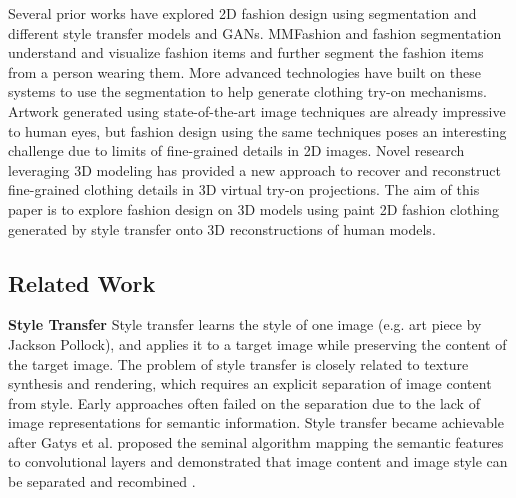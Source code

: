 \documentclass{article}
\begin{document}
Several prior works have explored 2D fashion design using segmentation and different style transfer models and GANs. MMFashion\cite{liu2021fashionVisTool} and fashion segmentation\cite{wang2020fashionSegmentation} understand and visualize fashion items and further segment the fashion items from a person wearing them. More advanced technologies have built on these systems to use the segmentation to help generate clothing try-on mechanisms\cite{Pang2021tryon, Tiwari2021tryon}. Artwork generated using state-of-the-art image techniques are already impressive to human eyes, but fashion design using the same techniques poses an interesting challenge due to limits of fine-grained details in 2D images. Novel research leveraging 3D modeling has provided a new approach to recover and reconstruct fine-grained clothing details in 3D virtual try-on projections. The aim of this paper is to explore fashion design on 3D models using  paint 2D fashion clothing generated by style transfer onto 3D reconstructions of human models.  


\subsection{Related Work}

\textbf{Style Transfer} Style transfer learns the style of one image (e.g. art piece by Jackson Pollock), and applies it to a target image while preserving the content of the target image. The problem of style transfer is closely related to texture synthesis and rendering, which requires an explicit separation of image content from style. Early approaches\cite{Hertzmann2001st, Ashikhmin2003st} often failed on the separation due to the lack of image representations for semantic information. Style transfer became achievable after Gatys et al. proposed the seminal algorithm mapping the semantic features to convolutional layers and demonstrated that image content and image style can be separated and recombined \cite{gatys2016styleTransfer}. 
\end{document}

